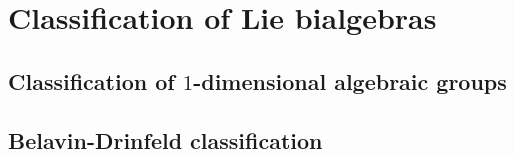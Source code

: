 \section{Classification of Lie bialgebras}
    \subsection{Classification of \texorpdfstring{$1$}{}-dimensional algebraic groups} \label{subsection: classification_of_1_dimensional_algebraic_groups}

    \subsection{Belavin-Drinfeld classification}